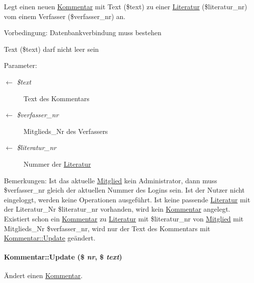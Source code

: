 Legt einen neuen \hyperlink{classKommentar}{Kommentar} mit Text (\$text) zu einer \hyperlink{classLiteratur}{Literatur} (\$literatur\_\-nr) vom einem Verfasser (\$verfasser\_\-nr) an. \begin{Desc}
\item[Vorbedingung:]Datenbankverbindung muss bestehen 

Text (\$text) darf nicht leer sein \end{Desc}
\begin{Desc}
\item[Parameter:]
\begin{description}
\item[\mbox{$\leftarrow$} {\em \$text}]Text des Kommentars \item[\mbox{$\leftarrow$} {\em \$verfasser\_\-nr}]Mitglieds\_\-Nr des Verfassers \item[\mbox{$\leftarrow$} {\em \$literatur\_\-nr}]Nummer der \hyperlink{classLiteratur}{Literatur} \end{description}
\end{Desc}
\begin{Desc}
\item[Bemerkungen:]Ist das aktuelle \hyperlink{classMitglied}{Mitglied} kein Administrator, dann muss \$verfasser\_\-nr gleich der aktuellen Nummer des Logins sein. Ist der Nutzer nicht eingeloggt, werden keine Operationen ausgeführt. Ist keine passende \hyperlink{classLiteratur}{Literatur} mit der Literatur\_\-Nr \$literatur\_\-nr vorhanden, wird kein \hyperlink{classKommentar}{Kommentar} angelegt. Existiert schon ein \hyperlink{classKommentar}{Kommentar} zu \hyperlink{classLiteratur}{Literatur} mit \$literatur\_\-nr von \hyperlink{classMitglied}{Mitglied} mit Mitglieds\_\-Nr \$verfasser\_\-nr, wird nur der Text des Kommentars mit \hyperlink{classKommentar_0b3e20e910493e67b67b747243f04511}{Kommentar::Update} geändert. \end{Desc}
\hypertarget{classKommentar_0b3e20e910493e67b67b747243f04511}{
\paragraph[Update]{\setlength{\rightskip}{0pt plus 5cm}Kommentar::Update (\$ {\em nr}, \$ {\em text})}\hfill}
\label{classKommentar_0b3e20e910493e67b67b747243f04511}


Ändert einen \hyperlink{classKommentar}{Kommentar}. 

